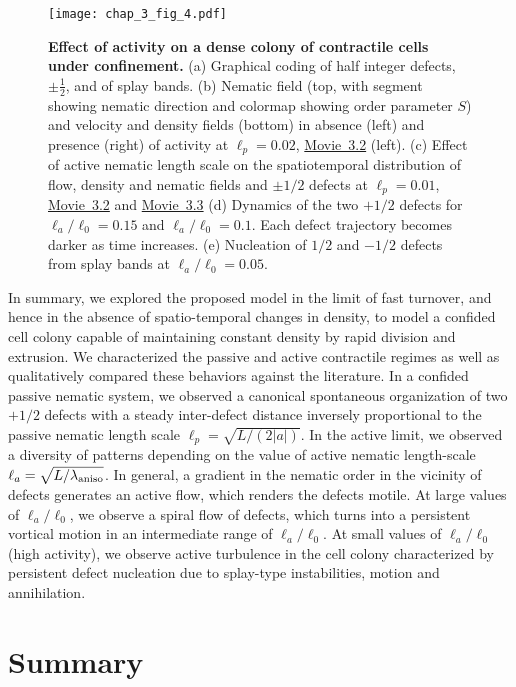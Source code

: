 \begin{figure}[tb]
	\centering
	\texttt{[image: chap\_3\_fig\_4.pdf]}

	\caption{\label{sec_1_chap_3_fig_3.5}  \textbf{Effect of activity on a dense colony of contractile cells under confinement.} (a) Graphical coding of   half integer defects, $\pm \frac{1}{2}$, and of splay bands. (b) Nematic field (top, with segment showing nematic direction and colormap showing order parameter $S$) and velocity and density fields (bottom)  in absence (left) and presence (right) of activity at $\ell_p=0.02$,  \href{https://github.com/waleedmirzaPhD/movies_thesis.git}{Movie~3.2}  (left).	(c) Effect of active nematic length scale on the spatiotemporal distribution of flow, density and nematic fields and $\pm 1/2$ defects at $\ell_p=0.01$,  \href{https://github.com/waleedmirzaPhD/movies_thesis.git}{Movie~3.2}  and \href{https://github.com/waleedmirzaPhD/movies_thesis.git}{Movie~3.3}  (d) Dynamics of the two $+1/2$ defects for $\ell_a/\ell_0=0.15$ and $\ell_a/\ell_0=0.1$. Each defect trajectory becomes darker as time increases. (e) Nucleation of $1/2$ and  $-1/2$ defects from splay bands at $\ell_a/\ell_0=0.05$. }
\end{figure}
In summary, we explored the proposed model in the limit of fast turnover, and hence in the absence of spatio-temporal changes in density, to model a confided cell colony capable of maintaining constant density by rapid division and extrusion. We characterized the passive and active contractile regimes as well as qualitatively compared these behaviors against the literature. In a confided passive nematic system, we observed a canonical spontaneous organization of two $+1/2$ defects with a steady inter-defect distance inversely proportional to the passive nematic length scale $\ell_p  = \sqrt{L/\left(2|a| \right)}$. In the active limit, we observed a diversity of patterns depending on the value of active nematic length-scale $\ell_a= \sqrt{L/\lambda_{\rm aniso}}$.  In general, a gradient in the nematic order in the vicinity of defects generates an active flow, which renders the defects motile. At large values of $\ell_a/\ell_0$, we observe a spiral flow of defects, which turns into a persistent vortical motion in an intermediate range of $\ell_a/\ell_0$. At small values of  $\ell_a/\ell_0$ (high activity), we observe active turbulence in the cell colony characterized by persistent defect nucleation due to splay-type instabilities, motion and annihilation. 

	\section{Summary}


